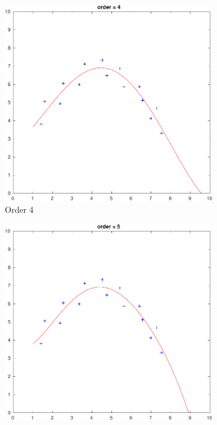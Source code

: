 \begin{figure}[htbp]
	\begin{subfigure}[t]{0.42\textwidth}
		\centering
		\includegraphics[width=\textwidth]{hw1/problem1/f2.pdf}
		\caption{Order 4}\label{fig:1b}
	\end{subfigure}
	\quad
	\begin{subfigure}[t]{0.42\textwidth}
		\centering
		\includegraphics[width=\textwidth]{hw1/problem1/f3.pdf}

\end{subfigure}
\end{figure}
